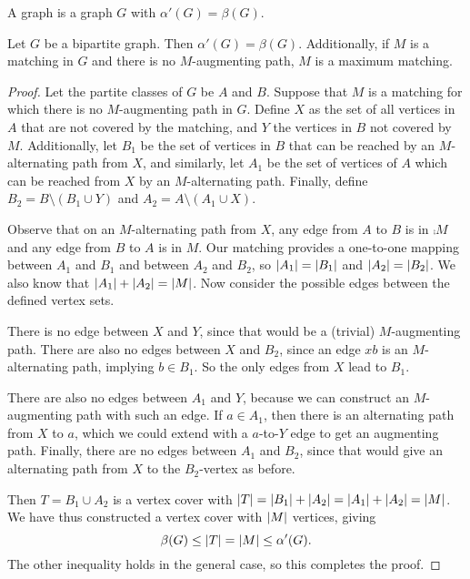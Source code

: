 
\begin{definition}
  A  graph is a graph $G$ with $\alpha'(G) = \beta(G)$.
\end{definition}

\begin{theorem}[König]
  Let $G$ be a bipartite graph.
  Then $\alpha'(G) = \beta(G)$.
  Additionally, if $M$ is a matching in $G$ and there is no $M$-augmenting
  path, $M$ is a maximum matching.
\end{theorem}

\begin{proof}
  Let the partite classes of $G$ be $A$ and $B$.
  Suppose that $M$ is a matching for which there is no $M$-augmenting path in
  $G$.
  Define $X$ as the set of all vertices in $A$ that are not covered by the
  matching, and $Y$ the vertices in $B$ not covered by $M$.
  Additionally, let $B_1$ be the set of vertices in $B$ that can be reached by
  an $M$-alternating path from $X$, and similarly, let $A_1$ be the set of
  vertices of $A$ which can be reached from $X$ by an $M$-alternating path.
  Finally, define $B_2 = B \setminus (B_1 \cup Y)$ and $A_2 = A \setminus (A_1
  \cup X)$.

  Observe that on an $M$-alternating path from $X$, any edge from $A$ to $B$ is
  in $\comp{M}$ and any edge from $B$ to $A$ is in $M$.
  Our matching provides a one-to-one mapping between $A_1$ and $B_1$ and between
  $A_2$ and $B_2$, so $\left| A_1 \right| = \left| B_1 \right|$ and $\left| A_2 \right| = \left| B_2 \right|$.
  We also know that $\left| A_1 \right| + \left| A_2 \right| = \left| M \right|$.
  Now consider the possible edges between the defined vertex sets.

  There is no edge between $X$ and $Y$, since that would be a (trivial)
  $M$-augmenting path.
  There are also no edges between $X$ and $B_2$, since an edge $xb$ is an
  $M$-alternating path, implying $b \in B_1$.
  So the only edges from $X$ lead to $B_1$.

  There are also no edges between $A_1$ and $Y$, because we can construct an
  $M$-augmenting path with such an edge.
  If $a \in A_1$, then there is an alternating path from $X$ to $a$, which we
  could extend with a $a$-to-$Y$ edge to get an augmenting path.
  Finally, there are no edges between $A_1$ and $B_2$, since that would give an
  alternating path from $X$ to the $B_2$-vertex as before.

  Then $T = B_1 \cup A_2$ is a vertex cover with
  $\left| T \right| = \left| B_1 \right| + \left| A_2 \right| = \left| A_1 \right| + \left| A_2 \right| = \left| M \right|$.
  We have thus constructed a vertex cover with $\left| M \right|$ vertices, giving
  \[
	\beta(G) \le \left| T \right| = \left| M \right| \le \alpha'(G).
  \]
  The other inequality holds in the general case, so this completes the proof.
\end{proof}

